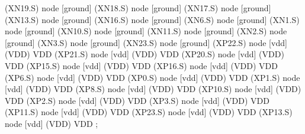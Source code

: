 \begin{circuitikz}[american]
	(XN19.S) node [ground] {}
	(XN18.S) node [ground] {}
	(XN17.S) node [ground] {}
	(XN13.S) node [ground] {}
	(XN16.S) node [ground] {}
	(XN6.S) node [ground] {}
	(XN1.S) node [ground] {}
	(XN10.S) node [ground] {}
	(XN11.S) node [ground] {}
	(XN2.S) node [ground] {}
	(XN3.S) node [ground] {}
	(XN23.S) node [ground] {}
	(XP22.S) node [vdd] (VDD) {VDD}
	(XP21.S) node [vdd] (VDD) {VDD}
	(XP20.S) node [vdd] (VDD) {VDD}
	(XP15.S) node [vdd] (VDD) {VDD}
	(XP16.S) node [vdd] (VDD) {VDD}
	(XP6.S) node [vdd] (VDD) {VDD}
	(XP0.S) node [vdd] (VDD) {VDD}
	(XP1.S) node [vdd] (VDD) {VDD}
	(XP8.S) node [vdd] (VDD) {VDD}
	(XP10.S) node [vdd] (VDD) {VDD}
	(XP2.S) node [vdd] (VDD) {VDD}
	(XP3.S) node [vdd] (VDD) {VDD}
	(XP11.S) node [vdd] (VDD) {VDD}
	(XP23.S) node [vdd] (VDD) {VDD}
	(XP13.S) node [vdd] (VDD) {VDD}
;

\end{circuitikz}
